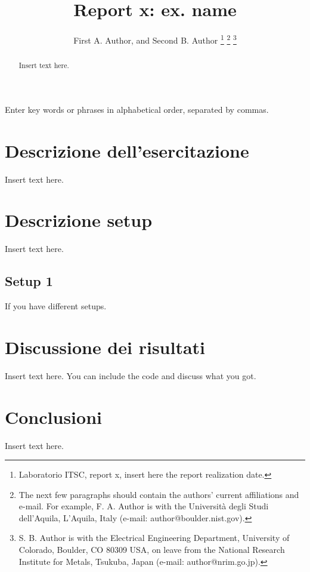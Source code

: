 \documentclass[9pt,shortpaper,twoside,web]{ieeecolor}
\begin{document}
\title{Report x: ex. name}
\author{First A. Author, and Second B. Author
\thanks{Laboratorio ITSC, report x, insert here the report realization date.}
\thanks{The next few paragraphs should contain 
the authors' current affiliations and e-mail. For 
example, F. A. Author is with the Universit\`{a} degli Studi dell'Aquila, L'Aquila, Italy (e-mail: author@boulder.nist.gov). }
\thanks{S. B. Author is with 
the Electrical Engineering Department, University of Colorado, Boulder, CO 
80309 USA, on leave from the National Research Institute for Metals, 
Tsukuba, Japan (e-mail: author@nrim.go.jp).}
}

\maketitle

\begin{abstract}
Insert text here.
\end{abstract}

\begin{IEEEkeywords}
Enter key words or phrases in alphabetical order, separated by commas. 
\end{IEEEkeywords}

\section{Descrizione dell'esercitazione}\label{sec:problemDescription}
Insert text here.

\section{Descrizione setup}
Insert text here.

\subsection{Setup 1}
If you have different setups.

\section{Discussione dei risultati}
Insert text here. You can include the code and discuss what you got.

\section{Conclusioni}
Insert text here.
\end{document}
